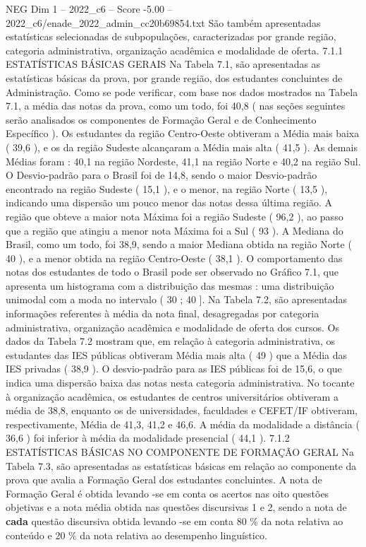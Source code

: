 \begin{textsample}{NEG Dim 1 – 2022\_c6 – Score -5.00 – 2022\_c6/enade\_2022\_admin\_cc20b69854.txt}
São também apresentadas estatísticas selecionadas de subpopulações, caracterizadas por grande região, categoria administrativa, organização acadêmica e modalidade de oferta. 7.1.1 ESTATÍSTICAS BÁSICAS GERAIS Na Tabela 7.1, são apresentadas as estatísticas básicas da prova, por grande região, dos estudantes concluintes de Administração.
Como se pode verificar, com base nos dados mostrados na Tabela 7.1, a média das notas da prova, como um todo, foi 40,8 ( nas seções seguintes serão analisados os componentes de Formação Geral e de Conhecimento Específico ).
Os estudantes da região Centro-Oeste obtiveram a Média mais baixa ( 39,6 ), e os da região Sudeste alcançaram a Média mais alta ( 41,5 ).
As demais Médias foram : 40,1 na região Nordeste, 41,1 na região Norte e 40,2 na região Sul.
O Desvio-padrão para o Brasil foi de 14,8, sendo o maior Desvio-padrão encontrado na região Sudeste ( 15,1 ), e o menor, na região Norte ( 13,5 ), indicando uma dispersão um pouco menor das notas dessa última região.
A região que obteve a maior nota Máxima foi a região Sudeste ( 96,2 ), ao passo que a região que atingiu a menor nota Máxima foi a Sul ( 93 ).
A Mediana do Brasil, como um todo, foi 38,9, sendo a maior Mediana obtida na região Norte ( 40 ), e a menor obtida na região Centro-Oeste ( 38,1 ).
O comportamento das notas dos estudantes de todo o Brasil pode ser observado no Gráfico 7.1, que apresenta um histograma com a distribuição das mesmas : uma distribuição unimodal com a moda no intervalo ( 30 ; 40 ].
Na Tabela 7.2, são apresentadas informações referentes à média da nota final, desagregadas por categoria administrativa, organização acadêmica e modalidade de oferta dos cursos.
Os dados da Tabela 7.2 mostram que, em relação à categoria administrativa, os estudantes das IES públicas obtiveram Média mais alta ( 49 ) que a Média das IES privadas ( 38,9 ).
O desvio-padrão para as IES públicas foi de 15,6, o que indica uma dispersão baixa das notas nesta categoria administrativa.
No tocante à organização acadêmica, os estudantes de centros universitários obtiveram a média de 38,8, enquanto os de universidades, faculdades e CEFET/IF obtiveram, respectivamente, Média de 41,3, 41,2 e 46,6.
A média da modalidade a distância ( 36,6 ) foi inferior à média da modalidade presencial ( 44,1 ). 7.1.2 ESTATÍSTICAS BÁSICAS NO COMPONENTE DE FORMAÇÃO GERAL Na Tabela 7.3, são apresentadas as estatísticas básicas em relação ao componente da prova que avalia a Formação Geral dos estudantes concluintes.
A nota de Formação Geral é obtida levando -se em conta os acertos nas oito questões objetivas e a nota média obtida nas questões discursivas 1 e 2, sendo a nota de \textbf{cada} questão discursiva obtida levando -se em conta 80 \% da nota relativa ao conteúdo e 20 \% da nota relativa ao desempenho linguístico.

\end{textsample}
